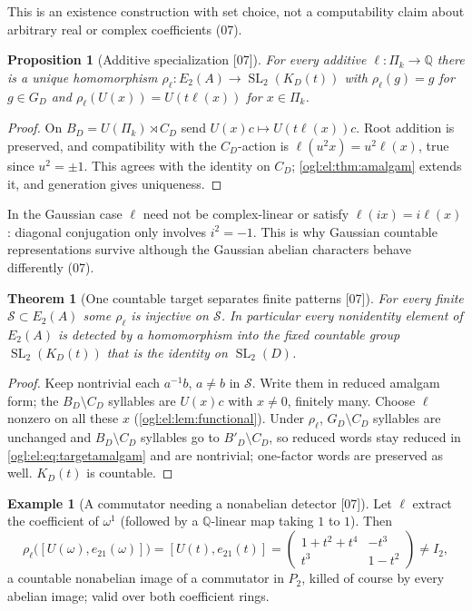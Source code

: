 \documentclass[11pt,oneside]{article}
\numberwithin{equation}{section}
\newtheorem{theorem}{Theorem}[section]
\newtheorem{proposition}[proposition]{Proposition}
\theoremstyle{definition}
\newtheorem{example}[example]{Example}
\theoremstyle{remark}
\newcommand{\Q}{\mathbb Q}
\newcommand{\SL}{\operatorname{SL}}
\newcommand{\src}[1]{\textup{\textsf{\small[#1]}}}
\begin{document}
This is an existence construction with set choice, not a computability claim
about arbitrary real or complex coefficients (07).

\begin{proposition}[Additive specialization \src{07}]\label{ogl:el:prop:specialize}
For every additive $\ell:\Pi_k\to\Q$ there is a unique homomorphism
$\rho_\ell:E_2(A)\to\SL_2(K_D(t))$ with $\rho_\ell(g)=g$ for $g\in G_D$ and
$\rho_\ell(U(x))=U(t\ell(x))$ for $x\in\Pi_k$.
\end{proposition}
\begin{proof}
On $B_D=U(\Pi_k)\rtimes C_D$ send $U(x)c\mapsto U(t\ell(x))c$. Root addition is
preserved, and compatibility with the $C_D$-action is $\ell(u^2x)=u^2\ell(x)$,
true since $u^2=\pm1$. This agrees with the identity on $C_D$;
\cref{ogl:el:thm:amalgam} extends it, and generation gives uniqueness.
\end{proof}

In the Gaussian case $\ell$ need not be complex-linear or satisfy
$\ell(ix)=i\ell(x)$: diagonal conjugation only involves $i^2=-1$. This is why
Gaussian countable representations survive although the Gaussian abelian
characters behave differently (07).

\begin{theorem}[One countable target separates finite patterns \src{07}]\label{ogl:el:thm:countable}
For every finite $\mathcal S\subset E_2(A)$ some $\rho_\ell$ is injective on
$\mathcal S$. In particular every nonidentity element of $E_2(A)$ is detected by
a homomorphism into the fixed countable group $\SL_2(K_D(t))$ that is the
identity on $\SL_2(D)$.
\end{theorem}
\begin{proof}
Keep nontrivial each $a^{-1}b$, $a\ne b$ in $\mathcal S$. Write them in reduced
amalgam form; the $B_D\setminus C_D$ syllables are $U(x)c$ with $x\ne0$, finitely
many. Choose $\ell$ nonzero on all these $x$ (\cref{ogl:el:lem:functional}).
Under $\rho_\ell$, $G_D\setminus C_D$ syllables are unchanged and
$B_D\setminus C_D$ syllables go to $B'_D\setminus C_D$, so reduced words stay
reduced in \eqref{ogl:el:eq:targetamalgam} and are nontrivial; one-factor words
are preserved as well. $K_D(t)$ is countable.
\end{proof}

\begin{example}[A commutator needing a nonabelian detector \src{07}]\label{ogl:el:ex:commutator}
Let $\ell$ extract the coefficient of $\omega^1$ (followed by a $\Q$-linear map
taking $1$ to $1$). Then
\[
 \rho_\ell\bigl([U(\omega),e_{21}(\omega)]\bigr)=[U(t),e_{21}(t)]
 =\begin{pmatrix}1+t^2+t^4&-t^3\\t^3&1-t^2\end{pmatrix}\ne I_2 ,
\]
a countable nonabelian image of a commutator in $P_2$, killed of course by every
abelian image; valid over both coefficient rings.
\end{example}
\end{document}
